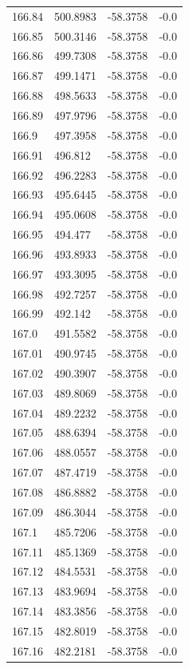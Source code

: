 \begin{table}[H]
\begin{tabular}{llll}
166.84 & 500.8983 & -58.3758 & -0.0 \\
166.85 & 500.3146 & -58.3758 & -0.0 \\
166.86 & 499.7308 & -58.3758 & -0.0 \\
166.87 & 499.1471 & -58.3758 & -0.0 \\
166.88 & 498.5633 & -58.3758 & -0.0 \\
166.89 & 497.9796 & -58.3758 & -0.0 \\
166.9 & 497.3958 & -58.3758 & -0.0 \\
166.91 & 496.812 & -58.3758 & -0.0 \\
166.92 & 496.2283 & -58.3758 & -0.0 \\
166.93 & 495.6445 & -58.3758 & -0.0 \\
166.94 & 495.0608 & -58.3758 & -0.0 \\
166.95 & 494.477 & -58.3758 & -0.0 \\
166.96 & 493.8933 & -58.3758 & -0.0 \\
166.97 & 493.3095 & -58.3758 & -0.0 \\
166.98 & 492.7257 & -58.3758 & -0.0 \\
166.99 & 492.142 & -58.3758 & -0.0 \\
167.0 & 491.5582 & -58.3758 & -0.0 \\
167.01 & 490.9745 & -58.3758 & -0.0 \\
167.02 & 490.3907 & -58.3758 & -0.0 \\
167.03 & 489.8069 & -58.3758 & -0.0 \\
167.04 & 489.2232 & -58.3758 & -0.0 \\
167.05 & 488.6394 & -58.3758 & -0.0 \\
167.06 & 488.0557 & -58.3758 & -0.0 \\
167.07 & 487.4719 & -58.3758 & -0.0 \\
167.08 & 486.8882 & -58.3758 & -0.0 \\
167.09 & 486.3044 & -58.3758 & -0.0 \\
167.1 & 485.7206 & -58.3758 & -0.0 \\
167.11 & 485.1369 & -58.3758 & -0.0 \\
167.12 & 484.5531 & -58.3758 & -0.0 \\
167.13 & 483.9694 & -58.3758 & -0.0 \\
167.14 & 483.3856 & -58.3758 & -0.0 \\
167.15 & 482.8019 & -58.3758 & -0.0 \\
167.16 & 482.2181 & -58.3758 & -0.0 \\

\end{tabular}
\end{table}
